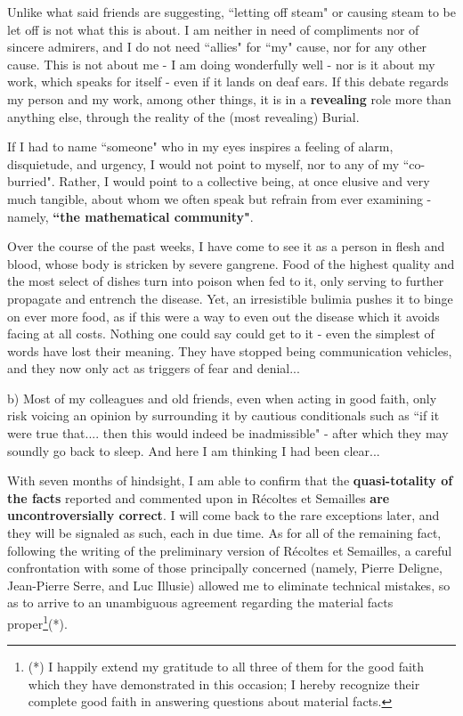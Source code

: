 Unlike what said friends are suggesting, ``letting off steam" or causing steam to be let off is not what this is about. I am neither in need of compliments nor of sincere admirers, and I do not need ``allies" for ``my" cause, nor for any other cause. This is not about me - I am doing wonderfully well - nor is it about my work, which speaks for itself - even if it lands on deaf ears. If this debate regards my person and my work, among other things, it is in a \textbf{revealing} role more than anything else, through the reality of the (most revealing) Burial.

If I had to name ``someone" who in my eyes inspires a feeling of alarm, disquietude, and urgency, I would not point to myself, nor to any of my ``co-burried". Rather, I would point to a collective being, at once elusive and very much tangible, about whom we often speak but refrain from ever examining - namely, \textbf{``the mathematical community"}.

Over the course of the past weeks, I have come to see it as a person in flesh and blood, whose body is stricken by severe gangrene. Food of the highest quality and the most select of dishes turn into poison when fed to it, only serving to further propagate and entrench the disease. Yet, an irresistible bulimia pushes it to binge on ever more food, as if this were a way to even out the disease which it avoids facing at all costs. Nothing one could say could get to it - even the simplest of words have lost their meaning. They have stopped being communication vehicles, and they now only act as triggers of fear and denial...

b) Most of my colleagues and old friends, even when acting in good faith, only risk voicing an opinion by surrounding it by cautious conditionals such as ``if it were true that.... then this would indeed be inadmissible" - after which they may soundly go back to sleep. And here I am thinking I had been clear...

With seven months of hindsight, I am able to confirm that the \textbf{quasi-totality of the facts} reported and commented upon in R\'ecoltes et Semailles \textbf{are uncontroversially correct}. I will come back to the rare exceptions later, and they will be signaled as such, each in due time. As for all of the remaining fact, following the writing of the preliminary version of R\'ecoltes et Semailles, a careful confrontation with some of those principally concerned (namely, Pierre Deligne, Jean-Pierre Serre, and Luc Illusie) allowed me to eliminate technical mistakes, so as to arrive to an unambiguous agreement regarding the material facts proper\footnote{(*) I happily extend my gratitude to all three of them for the good faith which they have demonstrated in this occasion; I hereby recognize their complete good faith in answering questions about material facts.}(*).

